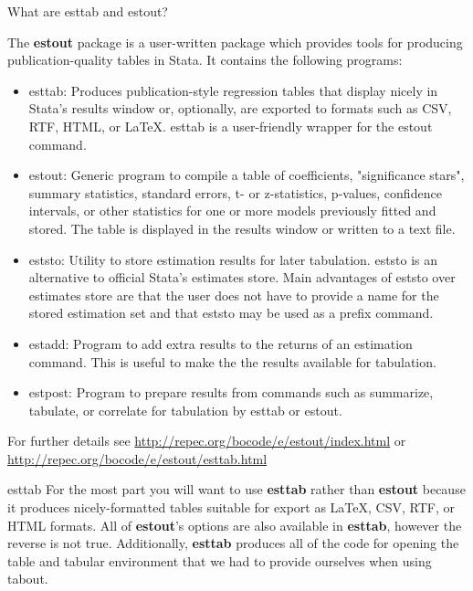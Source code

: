 \documentclass[fleqn, table, 10pt]{beamer}
\begin{document}
\begin{frame}{What are esttab and estout?}
    \footnotesize{
    The \textbf{estout} package is a user-written package which provides tools for producing publication-quality tables in Stata. It contains
    the following programs:
    \begin{itemize}
        \item esttab: Produces publication-style regression tables that display nicely in Stata's results window or, optionally, are exported to formats such as CSV, RTF, HTML, or \LaTeX{}. esttab is a user-friendly wrapper for the estout command. \pause
        \item estout: Generic program to compile a table of coefficients, "significance stars", summary statistics, standard errors, t- or z-statistics, p-values, confidence intervals, or other statistics for one or more models previously fitted and stored. The table is displayed in the results window or written to a text file. \pause
        \item eststo: Utility to store estimation results for later tabulation. eststo is an alternative to official Stata's estimates store. Main advantages of eststo over estimates store are that the user does not have to provide a name for the stored estimation set and that eststo may be used as a prefix command. \pause
        \item estadd: Program to add extra results to the returns of an estimation command. This is useful to make the the results available for tabulation. \pause
        \item estpost: Program to prepare results from commands such as summarize, tabulate, or correlate for tabulation by esttab or estout. \pause
    \end{itemize}
    }
    \footnotesize For further details see \url{http://repec.org/bocode/e/estout/index.html} or \\ \url{http://repec.org/bocode/e/estout/esttab.html}
\end{frame}

\begin{frame}{esttab}
    For the most part you will want to use \textbf{esttab} rather than \textbf{estout} because it produces nicely-formatted tables suitable
        for export as \LaTeX{}, CSV, RTF, or HTML formats. All of \textbf{estout}'s options are also available in \textbf{esttab}, however the
        reverse is not true. Additionally, \textbf{esttab} produces all of the code for opening the table and tabular environment that we had
        to provide ourselves when using tabout.
\end{frame}
\end{document}
